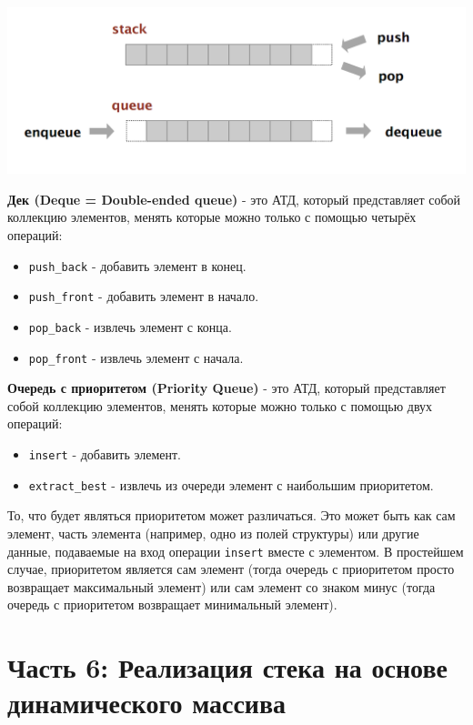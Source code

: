 \documentclass{article}
\begin{document}
\begin{center}
\includegraphics[scale=0.31]{../images/stack_queue.png}
\end{center}

\textbf{Дек (Deque = Double-ended queue)} - это АТД, который представляет собой коллекцию элементов, менять которые можно только с помощью четырёх операций:
\begin{itemize}
\item \texttt{push\_back} - добавить элемент в конец.
\item \texttt{push\_front} - добавить элемент в начало.
\item \texttt{pop\_back} - извлечь элемент с конца.
\item \texttt{pop\_front} - извлечь элемент с начала.\\
\end{itemize}

\textbf{Очередь с приоритетом (Priority Queue)} - это АТД, который представляет собой коллекцию элементов, менять которые можно только с помощью двух операций:
\begin{itemize}
\item \texttt{insert} - добавить элемент.
\item \texttt{extract\_best} - извлечь из очереди элемент с наибольшим приоритетом. 
\end{itemize}
То, что будет являться приоритетом может различаться. Это может быть как сам элемент, часть элемента (например, одно из полей структуры) или другие данные, подаваемые на вход операции \texttt{insert} вместе с элементом. В простейшем случае, приоритетом является сам элемент (тогда очередь с приоритетом просто возвращает максимальный элемент) или сам элемент со знаком минус (тогда очередь с приоритетом возвращает минимальный элемент).


\newpage
\section*{Часть 6: Реализация стека на основе динамического массива}
\end{document}
